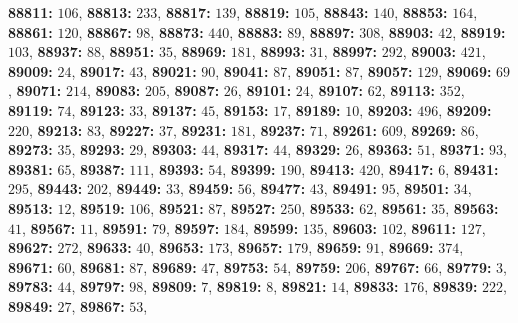 \textsf{\bfseries 88811:} $106$, \textsf{\bfseries 88813:} $233$, \textsf{\bfseries 88817:} $139$, \textsf{\bfseries 88819:} $105$, \textsf{\bfseries 88843:} $140$, \textsf{\bfseries 88853:} $164$, \textsf{\bfseries 88861:} $120$, \textsf{\bfseries 88867:} $98$, \textsf{\bfseries 88873:} $440$, \textsf{\bfseries 88883:} $89$, \textsf{\bfseries 88897:} $308$, \textsf{\bfseries 88903:} $42$, \textsf{\bfseries 88919:} $103$, \textsf{\bfseries 88937:} $88$, \textsf{\bfseries 88951:} $35$, \textsf{\bfseries 88969:} $181$, \textsf{\bfseries 88993:} $31$, \textsf{\bfseries 88997:} $292$, \textsf{\bfseries 89003:} $421$, \textsf{\bfseries 89009:} $24$, \textsf{\bfseries 89017:} $43$, \textsf{\bfseries 89021:} $90$, \textsf{\bfseries 89041:} $87$, \textsf{\bfseries 89051:} $87$, \textsf{\bfseries 89057:} $129$, \textsf{\bfseries 89069:} $69$, \textsf{\bfseries 89071:} $214$, \textsf{\bfseries 89083:} $205$, \textsf{\bfseries 89087:} $26$, \textsf{\bfseries 89101:} $24$, \textsf{\bfseries 89107:} $62$, \textsf{\bfseries 89113:} $352$, \textsf{\bfseries 89119:} $74$, \textsf{\bfseries 89123:} $33$, \textsf{\bfseries 89137:} $45$, \textsf{\bfseries 89153:} $17$, \textsf{\bfseries 89189:} $10$, \textsf{\bfseries 89203:} $496$, \textsf{\bfseries 89209:} $220$, \textsf{\bfseries 89213:} $83$, \textsf{\bfseries 89227:} $37$, \textsf{\bfseries 89231:} $181$, \textsf{\bfseries 89237:} $71$, \textsf{\bfseries 89261:} $609$, \textsf{\bfseries 89269:} $86$, \textsf{\bfseries 89273:} $35$, \textsf{\bfseries 89293:} $29$, \textsf{\bfseries 89303:} $44$, \textsf{\bfseries 89317:} $44$, \textsf{\bfseries 89329:} $26$, \textsf{\bfseries 89363:} $51$, \textsf{\bfseries 89371:} $93$, \textsf{\bfseries 89381:} $65$, \textsf{\bfseries 89387:} $111$, \textsf{\bfseries 89393:} $54$, \textsf{\bfseries 89399:} $190$, \textsf{\bfseries 89413:} $420$, \textsf{\bfseries 89417:} $6$, \textsf{\bfseries 89431:} $295$, \textsf{\bfseries 89443:} $202$, \textsf{\bfseries 89449:} $33$, \textsf{\bfseries 89459:} $56$, \textsf{\bfseries 89477:} $43$, \textsf{\bfseries 89491:} $95$, \textsf{\bfseries 89501:} $34$, \textsf{\bfseries 89513:} $12$, \textsf{\bfseries 89519:} $106$, \textsf{\bfseries 89521:} $87$, \textsf{\bfseries 89527:} $250$, \textsf{\bfseries 89533:} $62$, \textsf{\bfseries 89561:} $35$, \textsf{\bfseries 89563:} $41$, \textsf{\bfseries 89567:} $11$, \textsf{\bfseries 89591:} $79$, \textsf{\bfseries 89597:} $184$, \textsf{\bfseries 89599:} $135$, \textsf{\bfseries 89603:} $102$, \textsf{\bfseries 89611:} $127$, \textsf{\bfseries 89627:} $272$, \textsf{\bfseries 89633:} $40$, \textsf{\bfseries 89653:} $173$, \textsf{\bfseries 89657:} $179$, \textsf{\bfseries 89659:} $91$, \textsf{\bfseries 89669:} $374$, \textsf{\bfseries 89671:} $60$, \textsf{\bfseries 89681:} $87$, \textsf{\bfseries 89689:} $47$, \textsf{\bfseries 89753:} $54$, \textsf{\bfseries 89759:} $206$, \textsf{\bfseries 89767:} $66$, \textsf{\bfseries 89779:} $3$, \textsf{\bfseries 89783:} $44$, \textsf{\bfseries 89797:} $98$, \textsf{\bfseries 89809:} $7$, \textsf{\bfseries 89819:} $8$, \textsf{\bfseries 89821:} $14$, \textsf{\bfseries 89833:} $176$, \textsf{\bfseries 89839:} $222$, \textsf{\bfseries 89849:} $27$, \textsf{\bfseries 89867:} $53$, 
